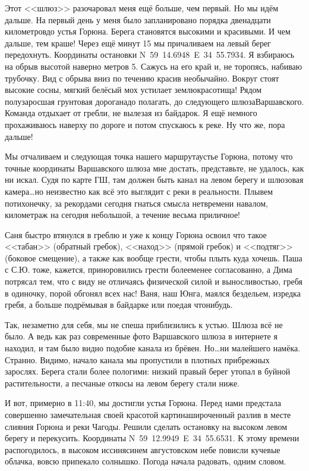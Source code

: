 Этот <<шлюз>> разочаровал меня ещё больше, чем первый. Но мы идём дальше. На первый день у меня было запланировано порядка двенадцати километров\mdash до устья Горюна. Берега становятся высокими и красивыми. И чем дальше, тем краше! Через ещё минут 15 мы причаливаем на левый берег передохнуть. Координаты остановки N~59\degree~14.6948\textprime~E~34\degree~55.7934\textprime. Я взбираюсь на обрыв высотой наверно метров 5. Сажусь на его край и, не торопясь, набиваю трубочку. Вид с обрыва вниз по течению красив необычайно. Вокруг стоят высокие сосны, мягкий белёсый мох устилает землю\mdash красотища! Рядом полузаросшая грунтовая дорога\mdash надо полагать, до следующего шлюза\mdash Варшавского. Команда отдыхает от гребли, не вылезая из байдарок. Я ещё немного прохаживаюсь наверху по дороге и потом спускаюсь к реке. Ну что же, пора дальше! 

Мы отчаливаем и следующая точка нашего маршрута\mdash устье Горюна, потому что точные координаты Варшавского шлюза мне достать, представьте, не удалось, как ни искал. Судя по карте ГШ, там должен быть канал на левом берегу и шлюзовая камера\ldots но неизвестно как всё это выглядит с реки в реальности. Плывем потихонечку, за рекордами сегодня гнаться смысла нет\mdash времени навалом, километраж на сегодня небольшой, а  течение весьма приличное! 

Саня быстро втянулся в греблю и уже к концу Горюна освоил что такое <<табан>> (обратный гребок), <<наход>> (прямой гребок) и <<подтяг>> (боковое смещение), а также как вообще грести, чтобы плыть куда хочешь. Паша с С.Ю. тоже, кажется, приноровились грести более\sdash менее согласованно, а Дима потрясал тем, что с виду не отличаясь физической силой и выносливостью, гребя в одиночку, порой обгонял всех нас! Ваня, наш Юнга, маялся бездельем, изредка гребя, а больше подрёмывая в байдарке или поедая что\sdash нибудь. 

Так, незаметно для себя, мы не спеша приблизились к устью. Шлюза всё не было. А ведь как раз современные фото Варшавского шлюза в интернете я находил, и там было видно подобие канала из брёвен. Но\ldots ни малейшего намёка. Странно. Видимо, начало канала мы пропустили в плотных прибрежных зарослях. Берега стали более пологими: низкий правый берег утопал в буйной растительности, а песчаные откосы на левом берегу стали ниже. 

И вот, примерно в 11:40, мы достигли устья Горюна. Перед нами предстала совершенно замечательная своей красотой картина\mdash широченный разлив в месте слияния Горюна и реки Чагоды. Решили сделать остановку на высоком левом берегу и перекусить. Координаты N~59\degree~12.9949\textprime~E~34\degree~55.6531\textprime. К этому времени распогодилось, в высоком иссиня\sdash синем августовском небе повисли кучевые облачка, вовсю припекало солнышко. Погода начала радовать, одним словом. 

